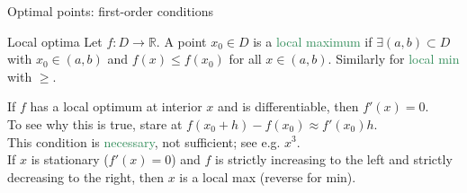 \documentclass[10pt]{beamer}
\begin{document}
\begin{frame}{Optimal points: first-order conditions}
\begin{block}{Local optima}
Let $f:D\to\mathbb{R}$. A point $x_0\in D$ is a \textcolor{SeaGreen}{local maximum} if $\exists (a,b)\subset D$ with $x_0\in(a,b)$ and $f(x)\le f(x_0)$ for all $x\in(a,b)$.
Similarly for \textcolor{SeaGreen}{local min} with $\ge$.\\[4mm]
	
\end{block}

\smallskip

If $f$ has a local optimum at interior $x$ and is differentiable, then $f'(x)=0$.\\[4mm]
\smallskip
To see why this is true, stare at $f(x_0+h)-f(x_0)\approx f'(x_0)h$.\\[4mm]

This condition is \textcolor{SeaGreen}{necessary}, not sufficient; see e.g. $x^3$.\\[4mm]

If $x$ is stationary ($f'(x)=0$) and $f$ is strictly increasing to the left and strictly decreasing to the right, then $x$ is a local max (reverse for min).

\end{frame}
\end{document}
